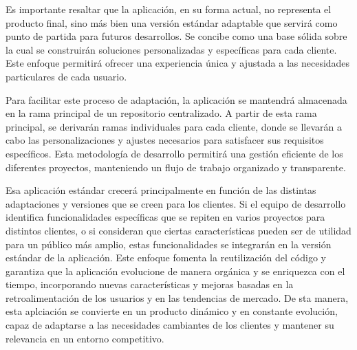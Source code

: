 \documentclass[12pt]{article}
\begin{document}
Es importante resaltar que la aplicación, en su forma actual, no representa el producto final, sino más bien una versión estándar adaptable que servirá como punto
de partida para futuros desarrollos. Se concibe como una base sólida sobre la cual se construirán soluciones personalizadas y específicas para cada cliente. Este enfoque
permitirá ofrecer una experiencia única y ajustada a las necesidades particulares de cada usuario.

Para facilitar este proceso de adaptación, la aplicación se mantendrá almacenada en la rama principal de un repositorio centralizado. A partir de esta rama principal,
se derivarán ramas individuales para cada cliente, donde se llevarán a cabo las personalizaciones y ajustes necesarios para satisfacer sus requisitos específicos.
Esta metodología de desarrollo permitirá una gestión eficiente de los diferentes proyectos, manteniendo un flujo de trabajo organizado y transparente.

Esa aplicación estándar crecerá principalmente en función de las distintas adaptaciones y versiones que se creen para los clientes. Si el equipo de desarrollo identifica funcionalidades
específicas que se repiten en varios proyectos para distintos clientes, o si consideran que ciertas características pueden ser de utilidad para un público más amplio, estas
funcionalidades se integrarán en la versión estándar de la aplicación. Este enfoque fomenta la reutilización del código y garantiza que la aplicación evolucione de manera
orgánica y se enriquezca con el tiempo, incorporando nuevas características y mejoras basadas en la retroalimentación de los usuarios y en las tendencias de mercado.
De sta manera, esta aplciación se convierte en un producto dinámico y en constante evolución, capaz de adaptarse a las necesidades cambiantes de los clientes y mantener 
su relevancia en un entorno competitivo.

\newpage
\end{document}
